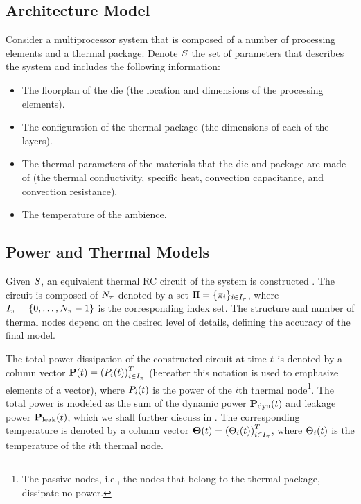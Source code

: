 \subsection{Architecture Model}
Consider a multiprocessor system that is composed of a number of processing elements and a thermal package. Denote $S$ the set of parameters that describes the system and includes the following information:
\begin{itemize}
  \item The floorplan of the die (the location and dimensions of the processing elements).
  \item The configuration of the thermal package (the dimensions of each of the layers).
  \item The thermal parameters of the materials that the die and package are made of (the thermal conductivity, specific heat, convection capacitance, and convection resistance).
  \item The temperature of the ambience.
\end{itemize}

\subsection{Power and Thermal Models}  
Given $S$, an equivalent thermal RC circuit of the system is constructed \cite{kreith2000}. The circuit is composed of $N_\pi$  denoted by a set $\Pi = \{ \pi_i \}_{i \in I_\pi}$, where $I_\pi = \{ 0, \dots, N_\pi - 1 \}$ is the corresponding index set. The structure and number of thermal nodes depend on the desired level of details, defining the accuracy of the final model.

The total power dissipation of the constructed circuit at time $t$ is denoted by a column vector $\mathbf{P}(t) = \left(P_i(t)\right)^T_{i \in I_\pi}$ (hereafter this notation is used to emphasize elements of a vector), where $P_i(t)$ is the power of the $i$th thermal node\footnote{The passive nodes, i.e., the nodes that belong to the thermal package, dissipate no power.}. The total power is modeled as the sum of the dynamic power $\mathbf{P}_{\text{dyn}}(t)$ and leakage power $\mathbf{P}_{\text{leak}}(t)$, which we shall further discuss in . The corresponding temperature is denoted by a column vector $\mathbf{\Theta}(t) = \left(\Theta_i(t)\right)^T_{i \in I_\pi}$, where $\Theta_i(t)$ is the temperature of the $i$th thermal node.


